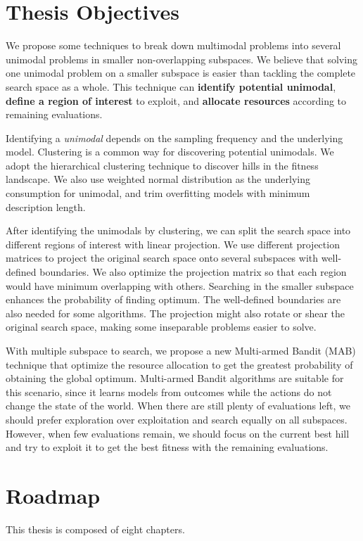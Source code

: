 \section{Thesis Objectives}
We propose some techniques to break down multimodal problems into several unimodal problems in smaller non-overlapping subspaces.
We believe that solving one unimodal problem on a smaller subspace is easier than tackling the complete search space as a whole.
This technique can \textbf{identify potential unimodal},
\textbf{define a region of interest} to exploit, 
and \textbf{allocate resources} according to remaining evaluations.

Identifying a \textit{unimodal} depends on the sampling frequency and the underlying model.
Clustering is a common way for discovering potential unimodals.
We adopt the hierarchical clustering technique to discover hills in the fitness landscape.
We also use weighted normal distribution as the underlying consumption for unimodal, and trim overfitting models with minimum description length.

After identifying the unimodals by clustering, we can split the search space into different regions of interest with linear projection.
We use different projection matrices to project the original search space onto several subspaces with well-defined boundaries.
We also optimize the projection matrix so that each region would have minimum overlapping with others.
Searching in the smaller subspace enhances the probability of finding optimum.
The well-defined boundaries are also needed for some algorithms.
The projection might also rotate or shear the original search space, making some inseparable problems easier to solve.

With multiple subspace to search, we propose a new Multi-armed Bandit (MAB) technique 
that optimize the resource allocation to get the greatest probability of obtaining the global optimum.
Multi-armed Bandit algorithms are suitable for this scenario, 
since it learns models from outcomes while the actions do not change the state of the world.
When there are still plenty of evaluations left, we should prefer exploration over exploitation and search equally on all subspaces.
However, when few evaluations remain, we should focus on the current best hill 
and try to exploit it to get the best fitness with the remaining evaluations.  


\section{Roadmap}
This thesis is composed of eight chapters.

